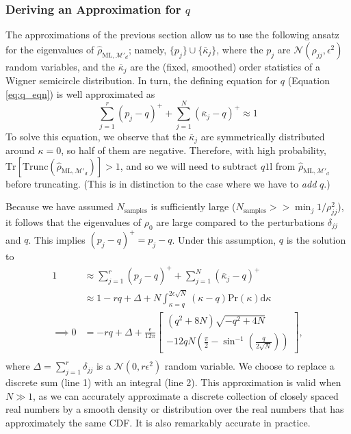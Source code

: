 \documentclass[aps,pra, twocolumn]{revtex4-1}
\newcommand{\M}{\mathcal{M}}
\newcommand{\Tr}{\mathrm{Tr}}
\newcommand{\Id}{\mathbb{I}}
\def\Id{1\!\mathrm{l}}
\newcommand{\rhohat}{\hat{\rho}}
\newcommand{\rhoML}[1]{\rhohat_{\scriptscriptstyle{\mathrm{ML},#1}}}
\begin{document}
\subsubsection{Deriving an Approximation for $q$}
The approximations of the previous section allow us to use the following ansatz for the eigenvalues of $\rhoML{\M'_{d}}$; namely, $\{p_j\} \cup \{\overline{\kappa}_j\}$, where the $p_j$ are $\mathcal{N}(\rho_{jj},\epsilon^2)$ random variables, and the $\overline{\kappa}_j$ are the (fixed, smoothed) order statistics of a Wigner semicircle distribution.  In turn, the defining equation for $q$ (Equation \eqref{eq:q_eqn}) is well approximated as
\begin{equation}
\sum_{j=1}^{r}(p_j - q)^{+} + \sum_{j=1}^{N}{(\overline{\kappa}_j-q)^+} \approx 1
\end{equation}
To solve this equation, we observe that the $\overline{\kappa}_j$ are symmetrically distributed around $
\kappa=0$, so half of them are negative.  Therefore, with high probability, $\Tr
\left[\mathrm{Trunc}(\rhoML{\M'_{d}})\right]>1$, and so we will need to subtract $q\Id$ from $\rhoML{\M'_{d}}$ before truncating. (This is in distinction to the case where we have to \emph{add} $q$.)

Because we have assumed $N_{\mathrm{samples}}$ is sufficiently large ($N_{\mathrm{samples}} >> \min_{j}1/\rho_{jj}^{2}$), it follows that the eigenvalues of $\rho_{0}$ are large compared to the perturbations $\delta_{jj}$ and $q$. This implies $(p_{j} - q)^{+} = p_{j} - q$. Under this assumption, $q$ is the solution to
\begin{align}
\nonumber 1 &\approx \sum_{j=1}^{r}(p_j - q)^{+} + \sum_{j=1}^{N}{(\overline{\kappa}_j-q)^+}\\
\nonumber &\approx 1 - rq + \Delta + N\int_{\kappa=q}^{2\epsilon\sqrt{N}}{(\kappa-q)\mathrm{Pr}(\kappa)\mathrm{d}\kappa}\\
\label{eq:q_eqn2}\implies 0 &= - rq + \Delta + \frac{\epsilon}{12\pi}\left[
\begin{array}{l} (q^2+8N)\sqrt{-q^2+4N} \\
-12qN\left(\frac{\pi}{2}-\sin^{-1}\left(\frac{q}{2\sqrt{N}}\right)\right)
\end{array}\right],\nonumber\\
~
\end{align}
where $\Delta = \sum_{j=1}^{r}\delta_{jj}$ is a $\mathcal{N}(0,r\epsilon^2)$ random variable.  We choose to replace a discrete 
sum (line 1) with an integral (line 2). This approximation is valid when $N\gg1$, as we can accurately approximate a discrete collection of closely spaced real numbers by a smooth density or distribution over the real numbers that has approximately the same CDF.  It is also remarkably accurate in practice.
  
\end{document}

